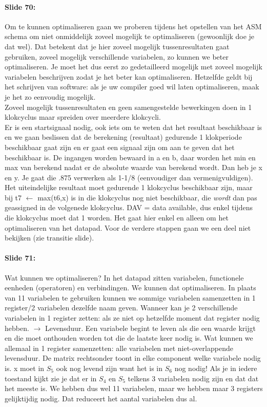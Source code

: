 \documentclass[10pt,a4paper]{book}
\begin{document}
\paragraph{Slide 70:} Om te kunnen optimaliseren gaan we proberen tijdens het opstellen van het ASM schema om niet onmiddelijk zoveel mogelijk te optimaliseren (gewoonlijk doe je dat wel). Dat betekent dat je hier zoveel mogelijk tussenresultaten gaat gebruiken, zoveel mogelijk verschillende variabelen, zo kunnen we beter optimaliseren. Je moet het dus eerst zo gedetailleerd mogelijk met zoveel mogelijk variabelen beschrijven zodat je het beter kan optimaliseren. Hetzelfde geldt bij het schrijven van software: als je uw compiler goed wil laten optimaliseren, maak je het zo eenvoudig mogelijk.\\
Zoveel mogelijk tussenresultaten en geen samengestelde bewerkingen doen in 1 klokcyclus maar spreiden over meerdere klokcycli.\\
Er is een startsignaal nodig, ook iets om te weten dat het resultaat beschikbaar is en we gaan beslissen dat de berekening (resultaat) gedurende 1 klokperiode beschikbaar gaat zijn en er gaat een signaal zijn om aan te geven dat het beschikbaar is. De ingangen worden bewaard in a en b, daar worden het min en max van berekend nadat er de absolute waarde van berekend wordt. Dan heb je x en y. Je gaat die .875 verwerken als 1-1/8 (eenvoudiger dan vermenigvuldigen). Het uiteindelijke resultaat moet gedurende 1 klokcyclus beschikbaar zijn, maar bij t7 $\leftarrow$ max(t6,x) is in die klokcyclus nog niet beschikbaar, die \emph{wordt} dan pas geassigned in de volgenede klokcyclus. DAV = data available, dus enkel tijdens die klokcyclus moet dat 1 worden. Het gaat hier enkel en alleen om het optimaliseren van het datapad. Voor de verdere stappen gaan we een deel niet bekijken (zie transitie slide).

\paragraph{Slide 71:} Wat kunnen we optimaliseren? In het datapad zitten variabelen, functionele eenheden (operatoren) en verbindingen. We kunnen dat optimaliseren. In plaats van 11 variabelen te gebruiken kunnen we sommige variabelen samenzetten in 1 register/2 variabelen dezelfde naam geven. Wanneer kan je 2 verschillende variabelen in 1 register zetten: als ze niet op hetzelfde moment dat register nodig hebben. $\rightarrow$ Levensduur. Een variabele begint te leven als die een waarde krijgt en die moet onthouden worden tot die de laatste keer nodig is. Wat kunnen we allemaal in 1 register samenzetten: alle variabelen met niet-overlappende levensduur. De matrix rechtsonder toont in elke component welke variabele nodig is. x moet in $S_5$ ook nog levend zijn want het is in $S_6$ nog nodig!
Als je in iedere toestand kijkt zie je dat er in $S_4$ en $S_5$ telkens 3 variabelen nodig zijn en dat dat het meeste is. We hebben dus wel 11 variabelen, maar we hebben maar 3 registers gelijktijdig nodig. Dat reduceert het aantal variabelen dus al.
\end{document}
